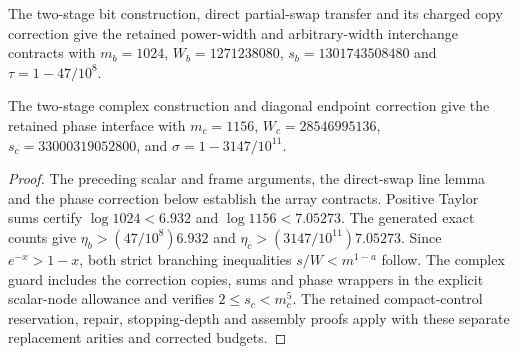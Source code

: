 \begin{proposition}\label{prop:two-stage-bit-interface}
The two-stage bit construction, direct partial-swap transfer and its charged
copy correction give the retained power-width and arbitrary-width interchange
contracts with $m_b=1024$, $W_b=1271238080$, $s_b=1301743508480$ and
$\tau=1-47/10^8$.
\end{proposition}
\begin{proposition}\label{prop:two-stage-complex-interface}
The two-stage complex construction and diagonal endpoint correction give the
retained phase interface with $m_c=1156$, $W_c=28546995136$,
$s_c=33000319052800$, and $\sigma=1-3147/10^{11}$.
\end{proposition}
\begin{proof}
The preceding scalar and frame arguments, the direct-swap line lemma and
the phase correction below establish the array contracts. Positive Taylor
sums certify $\log1024<6.932$ and $\log1156<7.05273$. The generated exact
counts give $\eta_b>(47/10^8)6.932$ and
$\eta_c>(3147/10^{11})7.05273$. Since $e^{-x}>1-x$, both strict
branching inequalities $s/W<m^{1-a}$ follow. The complex guard includes
the correction copies, sums and phase wrappers in the explicit scalar-node
allowance and verifies $2\le s_c<m_c^5$. The retained compact-control
reservation, repair, stopping-depth and assembly proofs apply with these
separate replacement arities and corrected budgets.
\end{proof}
